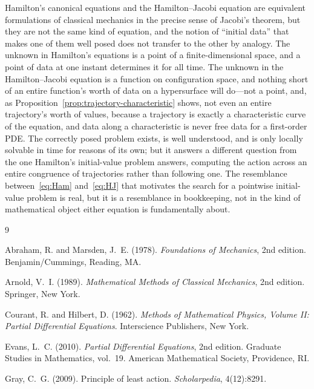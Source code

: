 \documentclass[11pt]{article}
\begin{document}
Hamilton's canonical equations and the Hamilton--Jacobi equation are equivalent formulations of classical mechanics in the precise sense of Jacobi's theorem, but they are not the same kind of equation, and the notion of ``initial data'' that makes one of them well posed does not transfer to the other by analogy. The unknown in Hamilton's equations is a point of a finite-dimensional space, and a point of data at one instant determines it for all time. The unknown in the Hamilton--Jacobi equation is a function on configuration space, and nothing short of an entire function's worth of data on a hypersurface will do---not a point, and, as Proposition~\ref{prop:trajectory-characteristic} shows, not even an entire trajectory's worth of values, because a trajectory is exactly a characteristic curve of the equation, and data along a characteristic is never free data for a first-order PDE. The correctly posed problem exists, is well understood, and is only locally solvable in time for reasons of its own; but it answers a different question from the one Hamilton's initial-value problem answers, computing the action across an entire congruence of trajectories rather than following one. The resemblance between~\eqref{eq:Ham} and~\eqref{eq:HJ} that motivates the search for a pointwise initial-value problem is real, but it is a resemblance in bookkeeping, not in the kind of mathematical object either equation is fundamentally about.


\begin{thebibliography}{9}

Abraham, R. and Marsden, J.~E. (1978).
\textit{Foundations of Mechanics}, 2nd edition.
Benjamin/Cummings, Reading, MA.

Arnold, V.~I. (1989).
\textit{Mathematical Methods of Classical Mechanics}, 2nd edition.
Springer, New York.

Courant, R. and Hilbert, D. (1962).
\textit{Methods of Mathematical Physics, Volume II: Partial Differential Equations}.
Interscience Publishers, New York.

Evans, L.~C. (2010).
\textit{Partial Differential Equations}, 2nd edition.
Graduate Studies in Mathematics, vol.~19. American Mathematical Society, Providence, RI.

Gray, C.~G. (2009).
Principle of least action.
\textit{Scholarpedia}, 4(12):8291.

\end{thebibliography}
\end{document}
